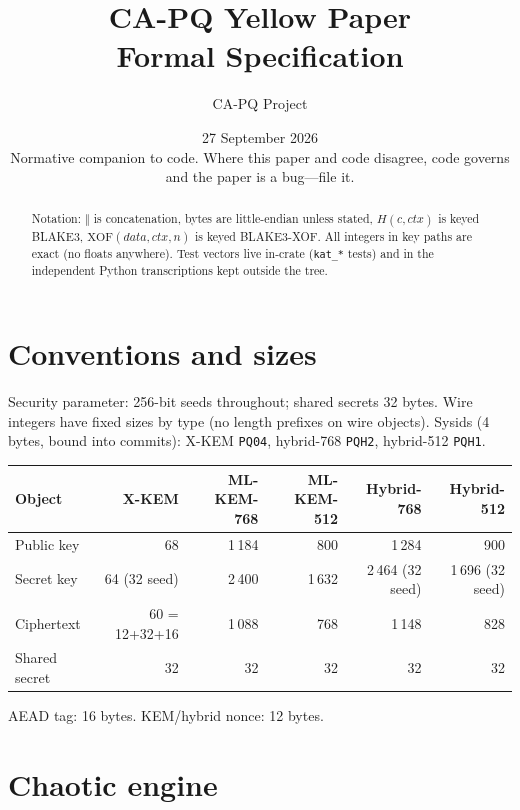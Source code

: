 \documentclass[11pt,a4paper]{article}
\title{\textbf{CA-PQ Yellow Paper}\\\large Formal Specification}
\author{CA-PQ Project}
\date{27 September 2026 \\ \small Normative companion to code. Where this paper and code disagree, code governs and the paper is a bug---file it.}
\begin{document}
\maketitle
\thispagestyle{fancy}

\begin{abstract}
Notation: $\Vert$ is concatenation, bytes are little-endian unless stated,
$H(c, \mathit{ctx})$ is keyed BLAKE3, $\mathrm{XOF}(\mathit{data}, \mathit{ctx}, n)$
is keyed BLAKE3-XOF. All integers in key paths are exact (no floats anywhere).
Test vectors live in-crate (\texttt{kat\_*} tests) and in the independent Python
transcriptions kept outside the tree.
\end{abstract}

\tableofcontents
\newpage

\section{Conventions and sizes}
\label{sec:sizes}

Security parameter: 256-bit seeds throughout; shared secrets 32 bytes. Wire
integers have fixed sizes by type (no length prefixes on wire objects).
Sysids (4 bytes, bound into commits): X-KEM \texttt{PQ04}, hybrid-768
\texttt{PQH2}, hybrid-512 \texttt{PQH1}.

\begin{table}[h]
\centering
\begin{tabular}{lrrrrr}
\toprule
Object & X-KEM & ML-KEM-768 & ML-KEM-512 & Hybrid-768 & Hybrid-512 \\
\midrule
Public key & 68 & 1\,184 & 800 & 1\,284 & 900 \\
Secret key & 64 (32 seed) & 2\,400 & 1\,632 & 2\,464 (32 seed) & 1\,696 (32 seed) \\
Ciphertext & 60 = 12+32+16 & 1\,088 & 768 & 1\,148 & 828 \\
Shared secret & 32 & 32 & 32 & 32 & 32 \\
\bottomrule
\end{tabular}
\end{table}

AEAD tag: 16 bytes. KEM/hybrid nonce: 12 bytes.

\section{Chaotic engine}
\label{sec:core}
\end{document}
